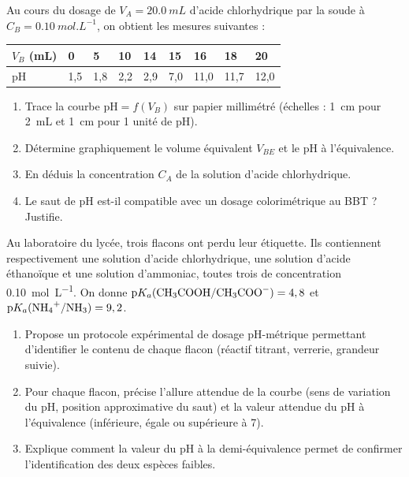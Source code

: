\documentclass[11pt]{article}
\begin{document}
\begin{exercice}
Au cours du dosage de $V_A = \SI{20,0}{mL}$ d'acide chlorhydrique par la soude à $C_B = \SI{0,10}{mol.L^{-1}}$, on obtient les mesures suivantes :

\begin{center}
\begin{tabularx}{\linewidth}{|l|X|X|X|X|X|X|X|X|}
\hline
\rowcolor{popblueL} $V_B$ (mL) & 0 & 5 & 10 & 14 & 15 & 16 & 18 & 20 \\
\hline pH & 1,5 & 1,8 & 2,2 & 2,9 & 7,0 & 11,0 & 11,7 & 12,0 \\
\hline
\end{tabularx}
\end{center}

\begin{enumerate}
\item Trace la courbe $\mathrm{pH} = f(V_B)$ sur papier millimétré (échelles : \SI{1}{cm} pour \SI{2}{mL} et \SI{1}{cm} pour 1 unité de pH).
\item Détermine graphiquement le volume équivalent $V_{BE}$ et le pH à l'équivalence.
\item En déduis la concentration $C_A$ de la solution d'acide chlorhydrique.
\item Le saut de pH est-il compatible avec un dosage colorimétrique au BBT ? Justifie.
\end{enumerate}
\end{exercice}

\begin{exercice}
Au laboratoire du lycée, trois flacons ont perdu leur étiquette. Ils contiennent respectivement une solution d'acide chlorhydrique, une solution d'acide éthanoïque et une solution d'ammoniac, toutes trois de concentration \SI{0,10}{mol.L^{-1}}. On donne $\mathrm{p}K_a(\ce{CH3COOH}/\ce{CH3COO-}) = 4,8$ et $\mathrm{p}K_a(\ce{NH4+}/\ce{NH3}) = 9,2$.
\begin{enumerate}
\item Propose un protocole expérimental de dosage pH-métrique permettant d'identifier le contenu de chaque flacon (réactif titrant, verrerie, grandeur suivie).
\item Pour chaque flacon, précise l'allure attendue de la courbe (sens de variation du pH, position approximative du saut) et la valeur attendue du pH à l'équivalence (inférieure, égale ou supérieure à 7).
\item Explique comment la valeur du pH à la demi-équivalence permet de confirmer l'identification des deux espèces faibles.
\end{enumerate}
\end{exercice}
\end{document}
